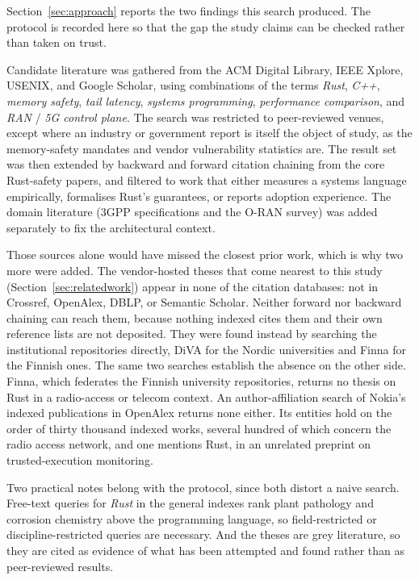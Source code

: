\documentclass[english,oneside,a4paper,censored,csm,software-track-2020]{HYthesisML}
\begin{document}
\begin{appendices}
Section~\ref{sec:approach} reports the two findings this search produced. The protocol is recorded
here so that the gap the study claims can be checked rather than taken on trust.

Candidate literature was gathered from the ACM Digital Library, IEEE Xplore, USENIX, and Google
Scholar, using combinations of the terms \emph{Rust}, \emph{C++}, \emph{memory safety}, \emph{tail
latency}, \emph{systems programming}, \emph{performance comparison}, and \emph{RAN} / \emph{5G
control plane}. The search was restricted to peer-reviewed venues, except where an industry or
government report is itself the object of study, as the memory-safety mandates and vendor
vulnerability statistics are.
The result set was then extended by backward and forward citation chaining from the core
Rust-safety papers, and filtered to work that either measures a systems language empirically,
formalises Rust's guarantees, or reports adoption experience. The domain literature (3GPP specifications and
the O-RAN survey) was added separately to fix the architectural context.

Those sources alone would have missed the closest prior work, which is why two more were added.
The vendor-hosted theses that come nearest to this study (Section~\ref{sec:relatedwork}) appear in
none of the citation databases: not in Crossref, OpenAlex, DBLP, or Semantic Scholar. Neither
forward nor backward chaining can reach them, because nothing indexed cites them and their own
reference lists are not deposited. They were found instead by searching the institutional
repositories directly, DiVA for the Nordic universities and Finna for the Finnish ones. The same
two searches establish the absence on the other side. Finna, which federates the Finnish
university repositories, returns no thesis on Rust in a radio-access or telecom context. An
author-affiliation search of Nokia's indexed publications in OpenAlex returns none either. Its
entities hold on the order of thirty thousand indexed works, several hundred of which concern the
radio access network, and one mentions Rust, in an unrelated preprint on trusted-execution
monitoring.

Two practical notes belong with the protocol, since both distort a naive search. Free-text queries
for \emph{Rust} in the general indexes rank plant pathology and corrosion chemistry above the
programming language, so field-restricted or discipline-restricted queries are necessary. And the
theses are grey literature, so they are cited as evidence of what has been attempted and found
rather than as peer-reviewed results.


\end{appendices}
\end{document}
